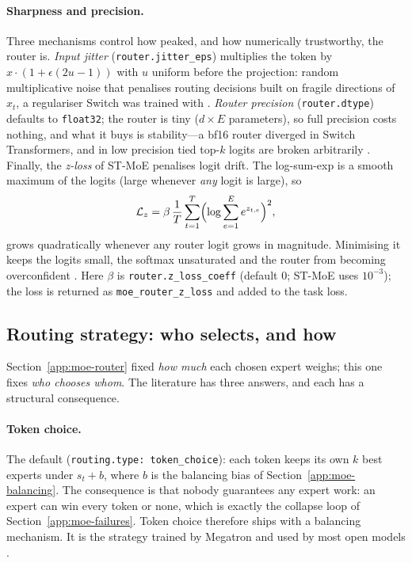 \paragraph{Sharpness and precision.}
Three mechanisms control how peaked, and how numerically trustworthy, the
router is. \emph{Input jitter} (\texttt{router.jitter\_eps}) multiplies the
token by $x \cdot (1 + \epsilon(2u-1))$ with $u$ uniform before the
projection: random multiplicative noise that penalises routing decisions
built on fragile directions of $x_t$, a regulariser Switch was trained with
\citep{fedus2021switch}. \emph{Router precision} (\texttt{router.dtype})
defaults to \texttt{float32}; the router is tiny ($d \times E$ parameters),
so full precision costs nothing, and what it buys is stability---a bf16
router diverged in Switch Transformers, and in low precision tied top-$k$
logits are broken arbitrarily \citep{fedus2021switch}. Finally, the
\emph{z-loss} of ST-MoE penalises logit drift. The log-sum-exp is a smooth
maximum of the logits (large whenever \emph{any} logit is large), so
\begin{equation}
  \mathcal{L}_z = \beta\,\frac{1}{T}\sum_{t=1}^{T}
  \Bigl(\log \sum_{e=1}^{E} e^{z_{t,e}}\Bigr)^{2},
  \label{eq:zloss}
\end{equation}
grows quadratically whenever any router logit grows in magnitude. Minimising
it keeps the logits small, the softmax unsaturated and the router from
becoming overconfident \citep{zoph2022stmoe}. Here $\beta$ is
\texttt{router.z\_loss\_coeff} (default $0$; ST-MoE uses $10^{-3}$); the loss
is returned as \texttt{moe\_router\_z\_loss} and added to the task loss.

\subsection{Routing strategy: who selects, and how}
\label{app:moe-routing}

Section~\ref{app:moe-router} fixed \emph{how much} each chosen expert weighs;
this one fixes \emph{who chooses whom}. The literature has three answers, and
each has a structural consequence.

\paragraph{Token choice.}
The default (\texttt{routing.type: token\_choice}): each token keeps its own
$k$ best experts under $s_t + b$, where $b$ is the balancing bias of
Section~\ref{app:moe-balancing}. The consequence is that nobody guarantees any
expert work: an expert can win every token or none, which is exactly the
collapse loop of Section~\ref{app:moe-failures}. Token choice therefore ships
with a balancing mechanism. It is the strategy trained by Megatron and used
by most open models \citep{fedus2021switch,deepseek2024v3}.

